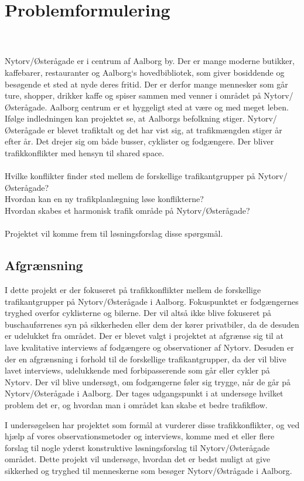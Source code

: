 \chapter{Problemformulering}
\label{chap:problemformulering}


\\\\
Nytorv/Østerågade er i centrum af Aalborg by. Der er mange moderne butikker, kaffebarer, restauranter og Aalborg`s hovedbibliotek, som giver bosiddende og besøgende et sted at nyde deres fritid. Der er derfor mange mennesker som går ture, shopper, drikker kaffe og spiser sammen med venner i området på Nytorv/Østerågade. Aalborg centrum er et hyggeligt sted at være og med meget leben. Ifølge indledningen kan projektet se, at Aalborgs befolkning stiger. Nytorv/Østerågade er blevet trafiktalt og det har vist sig, at trafikmængden stiger år efter år. Det drejer sig om både busser, cyklister og fodgængere. Der bliver trafikkonflikter med hensyn til shared space. 
\\\\
Hvilke konflikter finder sted mellem de forskellige trafikantgrupper på Nytorv/Østerågade?
\\
Hvordan kan en ny trafikplanlægning løse konflikterne?
\\
Hvordan skabes et harmonisk trafik område på Nytorv/Østerågade? 
\\\\
Projektet vil komme frem til løsningsforslag disse spørgsmål.



\section{Afgrænsning}
\label{sec:afgraensning}

I dette projekt er der fokuseret på trafikkonflikter mellem de forskellige trafikantgrupper på Nytorv/Østerågade i Aalborg. Fokuspunktet er fodgængernes tryghed overfor cyklisterne og bilerne. Der vil altså ikke blive fokuseret på buschauførrenes syn på sikkerheden eller dem der kører privatbiler, da de desuden er udelukket fra området. Der er blevet valgt i projektet at afgrænse sig til at lave kvalitative interviews af fodgængere og observationer af Nytorv. Desuden er der en afgrænsning i forhold til de forskellige trafikantgrupper, da der vil blive lavet interviews, udelukkende med forbipasserende som går eller cykler på Nytorv. Der vil blive undersøgt, om fodgængerne føler sig trygge, når de går på Nytorv/Østerågade i Aalborg. Der tages udgangspunkt i at undersøge hvilket problem det er, og hvordan man i området kan skabe et bedre trafikflow.

I undersøgelsen har projektet som formål at vurderer disse trafikkonflikter, og ved hjælp af vores observationsmetoder og interviews, komme med et eller flere forslag til nogle yderst konstruktive løsningsforslag til Nytorv/Østerågade området.  Dette projekt vil undersøge, hvordan det er bedst muligt at give sikkerhed og tryghed til menneskerne som besøger Nytorv/Østrågade i Aalborg.
